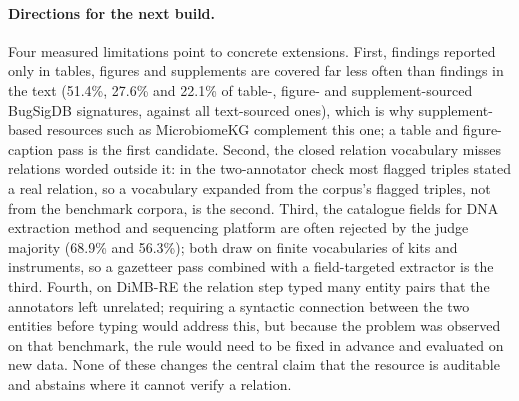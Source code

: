 \documentclass[referee,lineno,pdflatex,sn-vancouver-num]{sn-jnl}
\theoremstyle{thmstyleone}%
\theoremstyle{thmstyletwo}%
\theoremstyle{thmstylethree}%
\begin{document}

\paragraph{Directions for the next build.} Four measured limitations point
to concrete extensions. First, findings reported only in tables, figures and
supplements are covered far less often than findings in the text (51.4\%,
27.6\% and 22.1\% of table-, figure- and supplement-sourced BugSigDB signatures,
against all text-sourced ones), which is why supplement-based resources such as
MicrobiomeKG complement this one; a table and figure-caption pass is the first
candidate. Second, the closed relation vocabulary misses relations worded
outside it: in the two-annotator check most flagged triples stated a real
relation, so a vocabulary expanded from the corpus's flagged triples, not
from the benchmark corpora, is the second. Third, the catalogue fields for DNA
extraction method and sequencing platform are often rejected by the judge
majority (68.9\% and 56.3\%); both draw on finite vocabularies of kits and
instruments, so a gazetteer pass combined with a field-targeted extractor is the
third. Fourth, on DiMB-RE the relation step typed many entity pairs that the
annotators left unrelated; requiring a syntactic connection between the two
entities before typing would address this, but because the problem was
observed on that benchmark, the rule would need to be fixed in advance and
evaluated on new data. None of these changes the central claim that the
resource is auditable and abstains where it cannot verify a relation.
\end{document}
